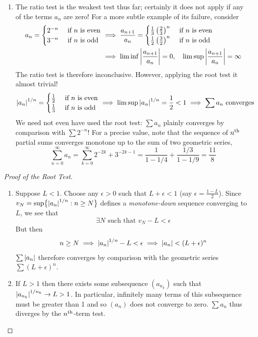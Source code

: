 \begin{examples}{}{}
\begin{enumerate}
	
	\item The ratio test is the weakest test thus far; certainly it does not apply if any of the terms $a_n$ are zero! For a more subtle example of its failure, consider
	\begin{align*}
		a_n=
		\begin{cases}
			2^{-n}&\text{ if $n$ is even}\\
			3^{-n}&\text{ if $n$ is odd}
		\end{cases}
		&\implies
		\frac{a_{n+1}}{a_n}=
		\begin{cases}
			\frac 13\left(\frac 23\right)^{n}&\text{ if $n$ is even}\\
			\frac 12\left(\frac 32\right)^{n}&\text{ if $n$ is odd}
		\end{cases}\\
		&
		\implies \liminf\left| \frac{a_{n+1}}{a_n}\right|=0,\quad 
		\limsup\left| \frac{a_{n+1}}{a_n}\right|=\infty
	\end{align*}
	The ratio test is therefore inconclusive.	However, applying the root test it almost trivial!
	\[
		\left| a_n\right|^{1/n}=
		\begin{cases}
			\frac 12&\text{ if $n$ is even}\\
			\frac 13&\text{ if $n$ is odd}
		\end{cases}
		\implies \limsup\left| a_n\right|^{1/n}=\frac 12<1
		\implies \sum a_n \text{ converges}
	\]
	We need not even have used the root test: $\sum a_n$ plainly converges by comparison with $\sum 2^{-n}$!\smallbreak
	For a precise value, note that the sequence of $n\textsuperscript{th}$ partial sums converges monotone up to the sum of two geometric series,
	\[
		\sum_{n=0}^\infty a_n
		=\sum_{k=0}^\infty 2^{-2k}+3^{-2k-1}
		=\frac 1{1-1/4}+\frac{1/3}{1-1/9}
		=\frac{11}8
	\]
\end{enumerate}
\end{examples}




\begin{proof}[Proof of the Root Test]
	\begin{enumerate}
		\item Suppose $L<1$. Choose any $\epsilon>0$ such that $L+\epsilon<1$ (say $\epsilon=\frac{1-L}2$). Since $v_N=\sup\bigl\{\left| a_n\right|^{1/n}:n\ge N\bigr\}$ defines a \emph{monotone-down} sequence converging to $L$, we see that
		\[
			\exists N\text{ such that }v_N-L<\epsilon
		\]
		But then
		\[
			n\ge N\implies\left| a_n\right|^{1/n}-L<\epsilon
			\implies \left| a_n\right|<(L+\epsilon)^n
		\]
		$\sum\left| a_n\right|$ therefore converges by comparison with the geometric series $\sum(L+\epsilon)^n$.
		
		\item If $L>1$ then there exists some subsequence $(a_{n_k})$ such that $\left| a_{n_k}\right|^{1/n_k}\to L>1$. In particular, infinitely many terms of this subsequence must be greater than 1 and so $(a_n)$ does not converge to zero. $\sum a_n$ thus diverges by the $n\textsuperscript{th}$-term test.\hfill\qedhere
	\end{enumerate}
\end{proof}


